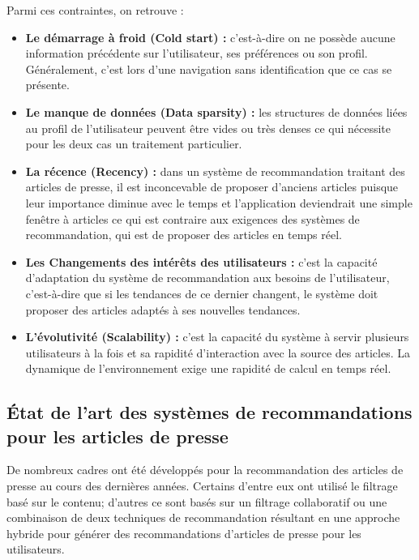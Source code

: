 Parmi ces contraintes, on retrouve :
\begin{itemize}
    
    \item \textbf{Le démarrage à froid (Cold start) : }c'est-à-dire on ne possède aucune information précédente sur l'utilisateur, ses préférences ou son profil. Généralement, c'est lors d'une navigation sans identification que ce cas se présente.\\
    
    \item \textbf{Le manque de données (Data sparsity) : }les structures de données liées au profil de l'utilisateur peuvent être vides ou très denses ce qui nécessite pour les deux cas un traitement particulier.\\
    
    \item \textbf{La récence (Recency)\label{recence} : }dans un système de recommandation traitant des articles de presse, il est inconcevable de proposer d'anciens articles puisque leur importance diminue avec le temps et l'application deviendrait une simple fenêtre à articles ce qui est contraire aux exigences des systèmes de recommandation, qui est de proposer des articles en temps réel.\\
    
    \item \textbf{Les Changements des intérêts des utilisateurs : }c'est la capacité d'adaptation du système de recommandation aux besoins de l'utilisateur, c'est-à-dire que si les tendances de ce dernier changent, le système doit proposer des articles adaptés à ses nouvelles tendances.\\
        
    \item \textbf{L'évolutivité (Scalability)\label{evolutivite} : }c'est la capacité du système à servir plusieurs utilisateurs à la fois et sa rapidité d'interaction avec la source des articles. La dynamique de l'environnement exige une rapidité de calcul en temps réel.\\
\end{itemize}

\subsection{État de l'art des systèmes de recommandations pour les articles de presse}
De nombreux cadres ont été développés pour la recommandation des articles de presse au cours des dernières années. Certains d'entre eux ont utilisé le filtrage basé sur le contenu; d'autres ce sont basés sur un filtrage collaboratif ou une combinaison de deux techniques de recommandation résultant en une approche hybride pour générer des recommandations d'articles de presse pour les utilisateurs.

